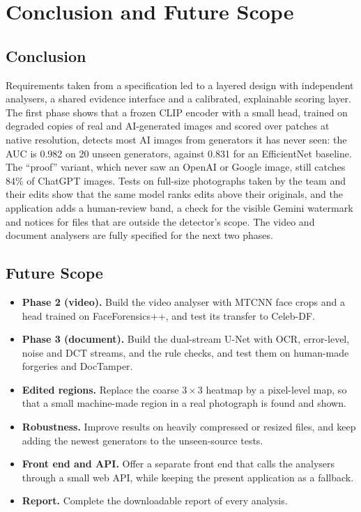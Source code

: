 \chapter{Conclusion and Future Scope}

\section{Conclusion}
Requirements taken from a specification led to a layered design with independent analysers, a shared evidence interface and a calibrated, explainable scoring layer. The first phase shows that a frozen CLIP encoder with a small head, trained on degraded copies of real and AI-generated images and scored over patches at native resolution, detects most AI images from generators it has never seen: the AUC is 0.982 on 20 unseen generators, against 0.831 for an EfficientNet baseline. The ``proof'' variant, which never saw an OpenAI or Google image, still catches 84\% of ChatGPT images. Tests on full-size photographs taken by the team and their edits show that the same model ranks edits above their originals, and the application adds a human-review band, a check for the visible Gemini watermark and notices for files that are outside the detector's scope. The video and document analysers are fully specified for the next two phases.

\section{Future Scope}
\begin{itemize}
  \item \textbf{Phase 2 (video).} Build the video analyser with MTCNN face crops and a head trained on FaceForensics++, and test its transfer to Celeb-DF.
  \item \textbf{Phase 3 (document).} Build the dual-stream U-Net with OCR, error-level, noise and DCT streams, and the rule checks, and test them on human-made forgeries and DocTamper.
  \item \textbf{Edited regions.} Replace the coarse $3\times3$ heatmap by a pixel-level map, so that a small machine-made region in a real photograph is found and shown.
  \item \textbf{Robustness.} Improve results on heavily compressed or resized files, and keep adding the newest generators to the unseen-source tests.
  \item \textbf{Front end and API.} Offer a separate front end that calls the analysers through a small web API, while keeping the present application as a fallback.
  \item \textbf{Report.} Complete the downloadable report of every analysis.
\end{itemize}
